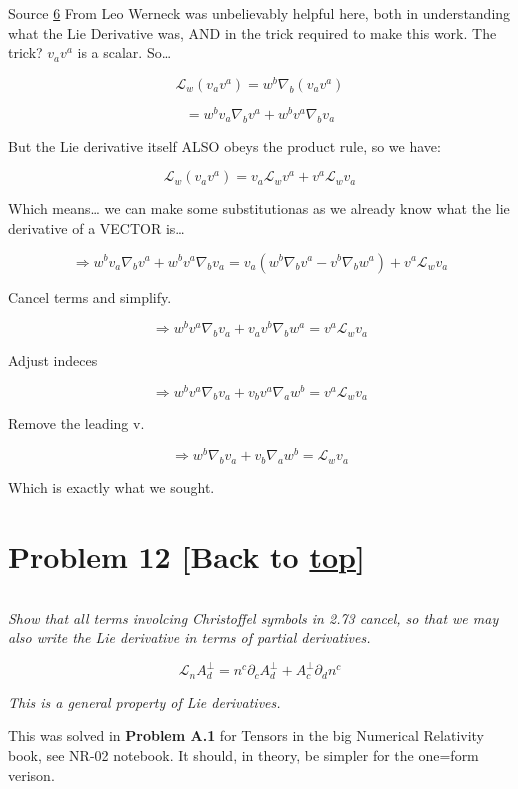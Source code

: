 \documentclass[landscape,letterpaper,10pt,english]{article}
\begin{document}
    Source \hyperref[6]{6} From Leo Werneck was unbelievably helpful here,
both in understanding what the Lie Derivative was, AND in the trick
required to make this work. The trick? \(v_av^a\) is a scalar.
So\ldots{}

\[ \mathcal{L}_w (v_av^a) = w^b \nabla_b (v_av^a) \]

\[ = w^b v_a \nabla_b v^a + w^b v^a \nabla_b v_a \]

But the Lie derivative itself ALSO obeys the product rule, so we have:

\[ \mathcal{L}_w (v_av^a) = v_a \mathcal{L}_w v^a + v^a \mathcal{L}_w v_a \]

    Which means\ldots{} we can make some substitutionas as we already know
what the lie derivative of a VECTOR is\ldots{}

\[ \Rightarrow w^b v_a \nabla_b v^a + w^b v^a \nabla_b v_a = v_a (w^b \nabla_b v^a - v^b \nabla_b w^a) + v^a \mathcal{L}_w v_a \]

    Cancel terms and simplify.

\[ \Rightarrow w^b v^a \nabla_b v_a + v_a v^b \nabla_b w^a = v^a \mathcal{L}_w v_a \]

Adjust indeces

\[ \Rightarrow w^b v^a \nabla_b v_a + v_b v^a \nabla_a w^b = v^a \mathcal{L}_w v_a \]

Remove the leading v.

\[ \Rightarrow w^b \nabla_b v_a + v_b \nabla_a w^b = \mathcal{L}_w v_a \]

Which is exactly what we sought.

    \hypertarget{problem-12-back-to-top}{%
\section{\texorpdfstring{Problem 12 {[}Back to
\hyperref[toc]{top}{]}}{Problem 12 {[}Back to {]}}}\label{problem-12-back-to-top}}

\[\label{P12}\]

\emph{Show that all terms involcing Christoffel symbols in 2.73 cancel,
so that we may also write the Lie derivative in terms of partial
derivatives.}

\[ \mathcal{L}_n A^\perp_d = n^c \partial_c A^\perp_d + A^\perp_c \partial_d n^c \]

\emph{This is a general property of Lie derivatives.}

This was solved in \textbf{Problem A.1} for Tensors in the big Numerical
Relativity book, see NR-02 notebook. It should, in theory, be simpler
for the one=form verison.
\end{document}
